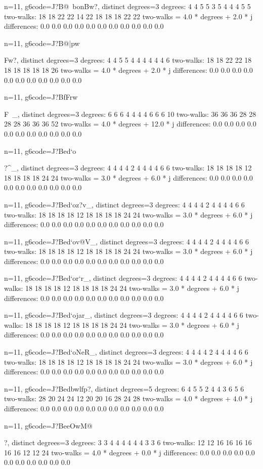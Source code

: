 {{{{{{{{{{{{n=11, g6code=J?B@~bonBw?, distinct degrees=3
degrees: 4 4 5 5 3 5 4 4 4 5 5 
two-walks: 18 18 22 22 14 22 18 18 18 22 22 
two-walks = 4.0 * degrees + 2.0 * j
differences: 0.0 0.0 0.0 0.0 0.0 0.0 0.0 0.0 0.0 0.0 0.0 

n=11, g6code=J?B@|pw{Fw?, distinct degrees=3
degrees: 4 4 5 5 4 4 4 4 4 4 6 
two-walks: 18 18 22 22 18 18 18 18 18 18 26 
two-walks = 4.0 * degrees + 2.0 * j
differences: 0.0 0.0 0.0 0.0 0.0 0.0 0.0 0.0 0.0 0.0 0.0 

n=11, g6code=J?BfFrw}F~_, distinct degrees=3
degrees: 6 6 6 4 4 4 4 6 6 6 10 
two-walks: 36 36 36 28 28 28 28 36 36 36 52 
two-walks = 4.0 * degrees + 12.0 * j
differences: 0.0 0.0 0.0 0.0 0.0 0.0 0.0 0.0 0.0 0.0 0.0 

n=11, g6code=J?Bed`o}?^_, distinct degrees=3
degrees: 4 4 4 4 2 4 4 4 4 6 6 
two-walks: 18 18 18 18 12 18 18 18 18 24 24 
two-walks = 3.0 * degrees + 6.0 * j
differences: 0.0 0.0 0.0 0.0 0.0 0.0 0.0 0.0 0.0 0.0 0.0 

n=11, g6code=J?Bed`oz?v_, distinct degrees=3
degrees: 4 4 4 4 2 4 4 4 4 6 6 
two-walks: 18 18 18 18 12 18 18 18 18 24 24 
two-walks = 3.0 * degrees + 6.0 * j
differences: 0.0 0.0 0.0 0.0 0.0 0.0 0.0 0.0 0.0 0.0 0.0 

n=11, g6code=J?Bed`ov@V_, distinct degrees=3
degrees: 4 4 4 4 2 4 4 4 4 6 6 
two-walks: 18 18 18 18 12 18 18 18 18 24 24 
two-walks = 3.0 * degrees + 6.0 * j
differences: 0.0 0.0 0.0 0.0 0.0 0.0 0.0 0.0 0.0 0.0 0.0 

n=11, g6code=J?Bed`or`r_, distinct degrees=3
degrees: 4 4 4 4 2 4 4 4 4 6 6 
two-walks: 18 18 18 18 12 18 18 18 18 24 24 
two-walks = 3.0 * degrees + 6.0 * j
differences: 0.0 0.0 0.0 0.0 0.0 0.0 0.0 0.0 0.0 0.0 0.0 

n=11, g6code=J?Bed`ojar_, distinct degrees=3
degrees: 4 4 4 4 2 4 4 4 4 6 6 
two-walks: 18 18 18 18 12 18 18 18 18 24 24 
two-walks = 3.0 * degrees + 6.0 * j
differences: 0.0 0.0 0.0 0.0 0.0 0.0 0.0 0.0 0.0 0.0 0.0 

n=11, g6code=J?Bed`oNeR_, distinct degrees=3
degrees: 4 4 4 4 2 4 4 4 4 6 6 
two-walks: 18 18 18 18 12 18 18 18 18 24 24 
two-walks = 3.0 * degrees + 6.0 * j
differences: 0.0 0.0 0.0 0.0 0.0 0.0 0.0 0.0 0.0 0.0 0.0 

n=11, g6code=J?Bedbwlfp?, distinct degrees=5
degrees: 6 4 5 5 2 4 4 3 6 5 6 
two-walks: 28 20 24 24 12 20 20 16 28 24 28 
two-walks = 4.0 * degrees + 4.0 * j
differences: 0.0 0.0 0.0 0.0 0.0 0.0 0.0 0.0 0.0 0.0 0.0 

n=11, g6code=J?BeeOwM@}?, distinct degrees=3
degrees: 3 3 4 4 4 4 4 4 3 3 6 
two-walks: 12 12 16 16 16 16 16 16 12 12 24 
two-walks = 4.0 * degrees + 0.0 * j
differences: 0.0 0.0 0.0 0.0 0.0 0.0 0.0 0.0 0.0 0.0 0.0 

}}}}}}}}}}
